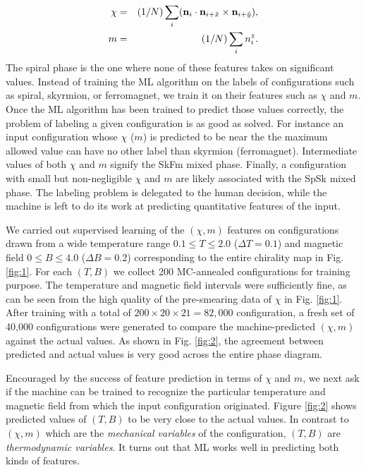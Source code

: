 \documentclass[reprint,amsmath,amssymb,aps,showpacs,superscriptaddress,prl]{revtex4-1}
\newcommand{\ba}{\begin{eqnarray}}
\newcommand{\ea}{\end{eqnarray}}
\renewcommand{\v}[1]{{\bf #1}}
\newcommand{\nn}{\nonumber \\}
\begin{document}
\ba
\chi & = & (1/N) \sum_i  ( \v n_i \cdot \v n_{i+\hat{x}} \times \v n_{i+\hat{y}} ) , \nn
%
m &=& (1/N) \sum_i n_i^z .  \label{eq:m-and-chi} \ea
%
The spiral phase is the one where none of these features takes on significant values. Instead of training the ML algorithm on the labels of configurations such as spiral, skyrmion, or ferromagnet, we train it on their features such as $\chi$ and $m$. Once the ML algorithm has been trained to predict those values correctly, the problem of labeling a given configuration is as good as solved. For instance an input configuration whose $\chi$ ($m$)  is predicted to be near the the maximum allowed value can have no other label than skyrmion (ferromagnet). Intermediate values of both $\chi$ and $m$ signify the SkFm mixed phase. Finally, a configuration with small but non-negligible $\chi$ and $m$ are likely associated with the SpSk mixed phase. The labeling problem is delegated to the human decision, while the machine is left to do its work at predicting quantitative features of the input.

We carried out supervised learning of the $(\chi, m)$ features on configurations drawn from a wide temperature range $0.1 \le T \le 2.0$ ($\Delta T= 0.1$) and magnetic field $0 \le B \le 4.0$ ($\Delta B = 0.2$) corresponding to the entire chirality map in Fig. \ref{fig:1}. For each $(T,B)$ we collect 200 MC-annealed configurations for training purpose. The temperature and magnetic field intervals were sufficiently fine, as can be seen from the high quality of the pre-smearing data of $\chi$ in Fig. \ref{fig:1}. After training with a total of $200\times 20\times 21 = 82,000$ configuration, a fresh set of 40,000 configurations were generated to compare the machine-predicted $(\chi,m)$ against the actual values. As shown in Fig. \ref{fig:2}, the agreement between predicted and actual values is very good across the entire phase diagram.

Encouraged by the success of feature prediction in terms of $\chi$ and $m$, we next ask if the machine can be trained to recognize the particular temperature and magnetic field from which the input configuration originated. Figure \ref{fig:2} shows predicted values of $(T,B)$ to be very close to the actual values\cite{comment}. In contrast to $(\chi, m)$ which are the {\it mechanical variables} of the configuration, $(T,B)$ are {\it thermodynamic variables}. It turns out that ML
works well in predicting both kinds of features.

\end{document}
